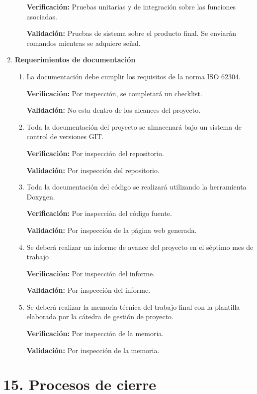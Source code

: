 \documentclass[
11pt, %
codirector, %
]{charter}
\begin{document}
\begin{enumerate}
\begin{enumerate}
			\textbf{Verificación:} Pruebas unitarias y de integración sobre las funciones asociadas.
			
			\textbf{Validación:} Pruebas de sistema sobre el producto final. Se enviarán comandos mientras se adquiere señal. 

		\end{enumerate}
	\item \textbf{Requerimientos de documentación}
		\begin{enumerate}
			\item La documentación debe cumplir los requisitos de la norma ISO 62304.
			
			\textbf{Verificación:} Por inspección, se completará un checklist.
			
			\textbf{Validación:} No esta dentro de los alcances del proyecto.
			\item Toda la documentación del proyecto se almacenará bajo un sistema de control de versiones GIT. 
			
			\textbf{Verificación:} Por inspección del repositorio.
			
			\textbf{Validación:} Por inspección del repositorio.
			\item Toda la documentación del código se realizará utilizando la herramienta Doxygen.
			
			\textbf{Verificación:} Por inspección del código fuente.
			
			\textbf{Validación:} Por inspección de la página web generada.
			\item Se deberá realizar un informe de avance del proyecto en el séptimo mes de trabajo
			
			\textbf{Verificación:} Por inspección del informe.
			
			\textbf{Validación:} Por inspección del informe.
			\item Se deberá realizar la memoria técnica del trabajo final con la plantilla elaborada por la cátedra de gestión de proyecto.
					
			\textbf{Verificación:} Por inspección de la memoria.
			
			\textbf{Validación:} Por inspección de la memoria.
	\end{enumerate}

\end{enumerate}


\section{15. Procesos de cierre}    
\label{sec:cierre}
\end{document}

